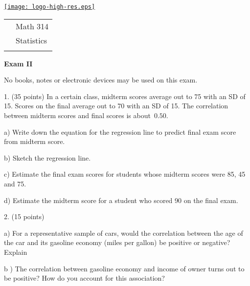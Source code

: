 \documentclass[10pt]{article}
\begin{document}
\pagestyle{empty}
\lstset{language=R, showspaces=false, showstringspaces=false}

\href{http://www.shepherd.edu}{\texttt{[image: logo-high-res.eps]}}
\vspace{-1.69cm}

{\small
\begin{tabular}{cl}
& Math 314\\
& Statistics\\
\hspace{5.28in} & %
\end{tabular}
}

\begin{center}
\textbf{\large  Exam II}
\end{center}
No books, notes or electronic devices may be used on this exam.
\medskip

1. (35 points) In a certain class, midterm scores average out to 75 with an SD of 15.  Scores
on the final average out to 70 with an SD of 15.
The correlation between midterm scores and final scores is 
about~$0.50$.   

\hspace{20pt} a) Write down the equation for the regression line to predict final exam score
from midterm score. %
\vspace{1.2in}

\hspace{20pt} b) Sketch the regression line. %
\vspace{1.5in}

\hspace{20pt} c) 
Estimate the  final exam scores for students whose midterm scores were
85, 45 and 75. %
\vspace{2.5in}

\hspace{20pt} d) Estimate the midterm score for a student who scored 90 on the final exam.
\vfill
\eject
{\ }


2. (15 points) 

\hspace{20pt} a) For a representative sample of cars, would the correlation between the
age of the car and its gasoline economy (miles per gallon) be positive or negative?  Explain
\vspace{1.75in}

\hspace{20pt} b ) The correlation between gasoline economy and income of owner turns out to 
be positive?  How do you account for this association?
\vspace{2in}
\end{document}
